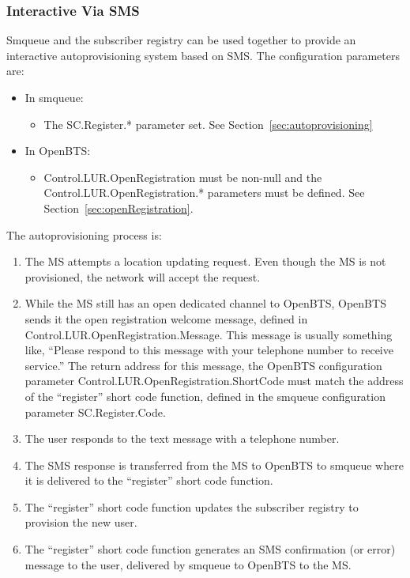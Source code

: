 \documentclass[11pt,openany]{book}
\begin{document}
\subsubsection{Interactive Via SMS}
\label{sec:SMSProvisioning}
Smqueue and the subscriber registry can be used together to provide an interactive autoprovisioning system based on SMS.
The configuration parameters are:
\begin{itemize}
	\item In smqueue:
	\begin{itemize}
		\item The SC.Register.* parameter set.  See Section~\ref{sec:autoprovisioning}
	\end{itemize}
	\item In OpenBTS:
	\begin{itemize}
		\item Control.LUR.OpenRegistration must be non-null and the Control.LUR.OpenRegistration.* parameters must be defined.  See Section~\ref{sec:openRegistration}.
	\end{itemize}	
\end{itemize}
The autoprovisioning process is:
\begin{enumerate}
	\item The MS attempts a location updating request.  Even though the MS is not provisioned, the network will accept the request.
	\item While the MS still has an open dedicated channel to OpenBTS, OpenBTS sends it the open registration welcome message, defined in Control.LUR.OpenRegistration.Message.  This message is usually something like, ``Please respond to this message with your telephone number to receive service.''  The return address for this message, the OpenBTS configuration parameter Control.LUR.OpenRegistration.ShortCode must match the address of the ``register'' short code function, defined in the smqueue configuration parameter SC.Register.Code.
	\item The user responds to the text message with a telephone number.
	\item The SMS response is transferred from the MS to OpenBTS to smqueue where it is delivered to the ``register'' short code function.
	\item The ``register'' short code function updates the subscriber registry to provision the new user.
	\item The ``register'' short code function generates an SMS confirmation (or error) message to the user, delivered by smqueue to OpenBTS to the MS.
\end{enumerate}
\end{document}
